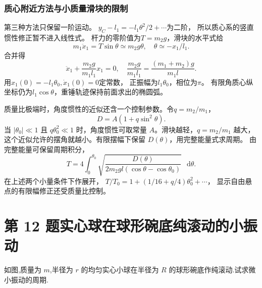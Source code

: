 \documentclass[UTF8,fontset=fandol,a4paper,11pt]{ctexart}
\newcommand{\dd}{\mathop{}\!\mathrm{d}}
\newcommand{\tagline}[1]{\noindent{\small\color{muted}#1}\par}
\newcommand{\figcaption}[1]{\par\vspace{2pt}{\small\color{muted}#1}\par}
\begin{document}
\subsubsection*{质心附近方法与小质量滑块的限制}
第三种方法只保留一阶运动。
$y_C-l_1=-l_1\theta^2/2+\cdots$为二阶，
所以质心系的竖直惯性修正暂不进入线性式。
杆力的零阶值为$T=m_2g$，滑块的水平式给
\[
m_1\ddot x_1=T\sin\theta\simeq m_2g\theta,
\quad\theta\simeq-x_1/l_1.
\]
合并得
\[
\ddot x_1+\frac{m_2g}{m_1l_1}x_1=0,
\quad\frac{m_2g}{m_1l_1}=\frac{(m_1+m_2)g}{m_1l}.
\]
用$x_1(0)=-l_1\theta_0,\dot x_1(0)=0$定常数，
正振幅为$l_1\theta_0$，相位为$\pi$。
有限角质心纵坐标仍为$l_1\cos\theta$，重锤轨迹保持前面求出的椭圆弧。

质量比极端时，角度惯性的近似还含一个控制参数。令$q=m_2/m_1$，
\[
D=A(1+q\sin^2\theta).
\]
当 $|\theta_0|\ll1$ 且 $q\theta_0^2\ll1$ 时，角度惯性可取常量 $A$。滑块越轻，$q=m_2/m_1$ 越大，这个近似允许的摆角就越小。有限摆幅下保留 $D(\theta)$，用完整能量式求周期。
由完整能量可保留周期积分，
\[
T=4\int_0^{\theta_0}
\sqrt{\frac{D(\theta)}{2m_2gl(\cos\theta-\cos\theta_0)}}\,\dd\theta.
\]
在上述两个小量条件下作展开，
$T/T_0=1+(1/16+q/4)\theta_0^2+\cdots$，
显示自由悬点的有限幅修正还受质量比控制。




\section*{第 12 题\quad 实心球在球形碗底纯滚动的小振动}

\tagline{M-07-12}

如图,质量为 \(m\),半径为 \(r\) 的均匀实心小球在半径为 \(R\)
的球形碗底作纯滚动.试求微小振动的周期.

\begin{center}\begin{minipage}{\linewidth}\centering{}\figcaption{图 7.12}\end{minipage}\end{center}
\end{document}
